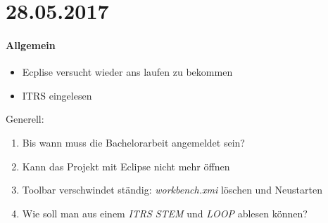 \section*{28.05.2017}

\paragraph{Allgemein}
\begin{itemize}
	\item Ecplise versucht wieder ans laufen zu bekommen
	\item ITRS eingelesen
\end{itemize}

Generell:
\begin{enumerate}
	\item Bis wann muss die Bachelorarbeit angemeldet sein?
	\item Kann das Projekt mit Eclipse nicht mehr öffnen
	\item Toolbar verschwindet ständig: \answer \emph{workbench.xmi} löschen und Neustarten
	\item Wie soll man aus einem \emph{ITRS} \emph{STEM} und \emph{LOOP} ablesen können?
\end{enumerate}